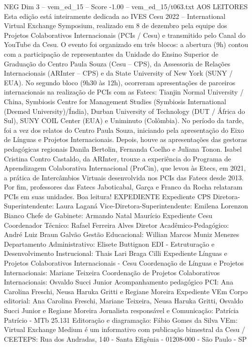 \begin{textsample}{NEG Dim 3 – vem\_ed\_15 – Score -1.00 – vem\_ed\_15/t063.txt}  \label{ex:f3_neg_014}
AOS LEITORES Esta edição está inteiramente dedicada ao IVES Cesu 2022 – International Virtual Exchange Symposium, realizado em 8 de dezembro pela equipe dos Projetos Colaborativos Internacionais (PCIs / Cesu) e transmitido pelo Canal do YouTube da Cesu.
O evento foi organizado em três blocos: a abertura (9h) contou com a participação de representantes da Unidade do Ensino Superior de Graduação do Centro Paula Souza (Cesu – CPS), da Assessoria de Relações Internacionais (ARInter – CPS) e da State University of New York (SUNY / EUA).
No segundo bloco (9h30 às 12h), ocorreram apresentações de parceiros internacionais na realização de PCIs com as Fatecs: Tianjin Normal University / China, Symbiosis Centre for Management Studies (Symbiosis International (Deemed University)/Índia), Durban University of Technology (DUT / África do Sul), SUNY COIL Center (EUA) e Uniminuto (Colômbia).
No período da tarde, foi a vez dos relatos do Centro Paula Souza, iniciando pela apresentação do Eixo de Línguas e Projetos Internacionais.
Depois, houve as apresentações das gestoras pedagógicas regionais Danila Bertolin, Fernanda Coelho e Juliana Tonon.
Isabel Cristina Contro Castaldo, da ARInter, trouxe a experiência do Programa de Aprendizagem Colaborativa Internacional (ProCin), que levou às Etecs, em 2021, a prática de Intercâmbios Virtuais desenvolvida nos PCIs das Fatecs desde 2013.
Por fim, professores das Fatecs Jaboticabal, Garça e Franco da Rocha relataram PCIs em suas unidades.
Boa leitura!
EXPEDIENTE Expediente CPS Diretora-Superintendente: Laura Laganá Vice-Diretora-Superintendente: Emilena Lorenzon Bianco Chefe de Gabinete: Armando Natal Maurício Expediente Cesu Coordenador Técnico: Rafael Ferreira Alves Diretor Acadêmico-Pedagógico: André Luiz Braun Galvão Gestão Educacional: Willian Marcos Muniz Menezes Departamento Administrativo: Elisete Buttignon EDI - Estruturação e Desenvolvimento Instrucional: Thais Lari Braga Cilli Expediente Línguas e Projetos Colaborativos Internacionais - Cesu Coordenação de Línguas e Projetos Internacionais: Mariane Teixeira Coordenação de Projetos Colaborativos Internacionais: Osvaldo Succi Junior Acompanhamento pedagógico PCI: Ana Carolina Freschi, Neusa Haruka Gritti e Regiane Moreira Expediente VEm Corpo editorial: Ana Carolina Freschi, Mariane Teixeira, Neusa Haruka Gritti, Osvaldo Succi Junior e Regiane Moreira Jornalista responsável e Comunicação: Patrícia Patrício - MTb 25.131 Editoração e diagramação: Fábio Gomes da Silva VEm: Virtual Exchange Medium é um informativo com publicação bimestral da Cesu / CEETEPS: Rua dos Andradas, 140 - Santa Efigênia - 01208-000 - São Paulo - SP

\end{textsample}
